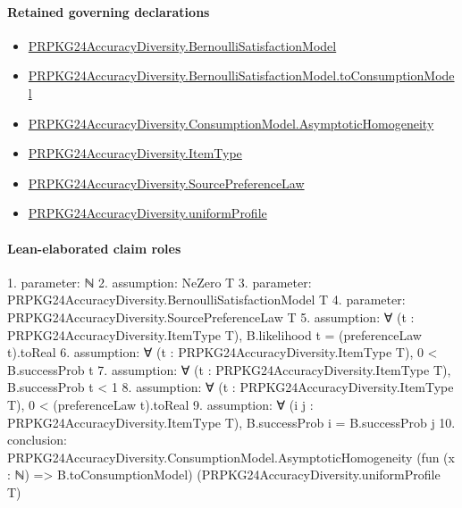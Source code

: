 \documentclass[10pt]{article}
\begin{document}
\paragraph{Retained governing declarations}
\begin{itemize}\raggedright
\item \hyperlink{governing-declaration-ff558d2515b00bf9}{PRPKG24\allowbreak{}Accuracy\allowbreak{}Diversity.\allowbreak{}Bernoulli\allowbreak{}Satisfaction\allowbreak{}Model}
\item \hyperlink{governing-declaration-8d0c8285202429bc}{PRPKG24\allowbreak{}Accuracy\allowbreak{}Diversity.\allowbreak{}Bernoulli\allowbreak{}Satisfaction\allowbreak{}Model.\allowbreak{}to\allowbreak{}Consumption\allowbreak{}Model}
\item \hyperlink{governing-declaration-444c43dd830e2370}{PRPKG24\allowbreak{}Accuracy\allowbreak{}Diversity.\allowbreak{}Consumption\allowbreak{}Model.\allowbreak{}Asymptotic\allowbreak{}Homogeneity}
\item \hyperlink{governing-declaration-562ef32e180a12be}{PRPKG24\allowbreak{}Accuracy\allowbreak{}Diversity.\allowbreak{}Item\allowbreak{}Type}
\item \hyperlink{governing-declaration-e662f313179ba80f}{PRPKG24\allowbreak{}Accuracy\allowbreak{}Diversity.\allowbreak{}Source\allowbreak{}Preference\allowbreak{}Law}
\item \hyperlink{governing-declaration-f665140f30fcdeaf}{PRPKG24\allowbreak{}Accuracy\allowbreak{}Diversity.\allowbreak{}uniform\allowbreak{}Profile}
\end{itemize}
\paragraph{Lean-elaborated claim roles}\begin{ReviewVerbatim}
1. parameter: ℕ
2. assumption: NeZero T
3. parameter: PRPKG24AccuracyDiversity.BernoulliSatisfactionModel T
4. parameter: PRPKG24AccuracyDiversity.SourcePreferenceLaw T
5. assumption: ∀ (t : PRPKG24AccuracyDiversity.ItemType T), B.likelihood t = (preferenceLaw t).toReal
6. assumption: ∀ (t : PRPKG24AccuracyDiversity.ItemType T), 0 < B.successProb t
7. assumption: ∀ (t : PRPKG24AccuracyDiversity.ItemType T), B.successProb t < 1
8. assumption: ∀ (t : PRPKG24AccuracyDiversity.ItemType T), 0 < (preferenceLaw t).toReal
9. assumption: ∀ (i j : PRPKG24AccuracyDiversity.ItemType T), B.successProb i = B.successProb j
10. conclusion: PRPKG24AccuracyDiversity.ConsumptionModel.AsymptoticHomogeneity (fun (x : ℕ) => B.toConsumptionModel)
  (PRPKG24AccuracyDiversity.uniformProfile T)
\end{ReviewVerbatim}
\end{document}
